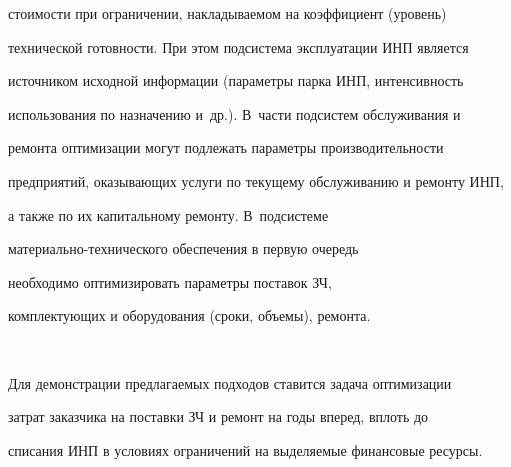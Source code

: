 стоимости при ограничении, накладываемом на коэффициент (уровень)

технической готовности. При этом подсистема эксплуатации ИНП является

источником исходной информации (параметры парка ИНП, интенсивность

использования по назначению и~др.). В~части подсистем обслуживания и

ремонта оптимизации могут подлежать параметры производительности

предприятий, оказывающих услуги по текущему обслуживанию и ремонту ИНП,

а также по их капитальному ремонту. В~подсистеме

     ма\-те\-ри\-аль\-но-тех\-ни\-че\-ско\-го обеспечения в первую очередь

необходимо оптимизировать параметры поставок ЗЧ,

комплектующих и оборудования (сроки, объемы), ремонта.



\pagebreak



\



\vspace*{-12pt}






     Для демонстрации предлагаемых подходов ставится задача оптимизации

затрат заказчика на поставки ЗЧ и ремонт на годы вперед, вплоть до

списания ИНП в условиях ограничений на выделяемые финансовые ресурсы.



